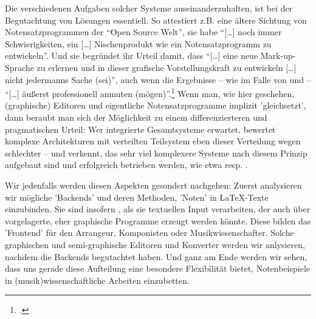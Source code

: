 Die verschiedenen Aufgaben solcher Systeme auseinanderzuhalten, ist bei der
Begutachtung von Lösungen essentiell. So attestiert z.B. eine ältere Sichtung
von Notensatzprogrammen der \enquote{Open Source Welt}, sie habe
\enquote{[\ldots] noch immer Schwierigkeiten, ein [\ldots] Nischenprodukt wie
ein Notensatzprogramm zu entwickeln}. Und sie begründet ihr Urteil damit, dass
\enquote{[\ldots] eine neue Mark-up-Sprache zu erlernen und in dieser grafische
Vorstellungskraft zu entwickeln [\ldots] nicht jedermanns Sache (sei)}, auch
wenn die Ergebnisse -- wie im Falle von  und  --
\enquote{[\ldots] äußerst professionell anmuten
(mögen)}.\footcite[vgl.][51]{Albrecht2009a} Wenn man, wie hier geschehen,
(graphische) Editoren und eigentliche Notensatzprogramme implizit 'gleichsetzt',
dann beraubt man sich der Möglichkeit zu einem differenzierteren und
pragmatischen Urteil: Wer integrierte Gesamtsysteme erwartet, bewertet komplexe
Architekturen mit verteilten Teilsystem eben dieser Verteilung wegen schlechter
-- und verkennt, das sehr viel komplexere Systeme nach diesem Prinzip aufgebaut
sind und erfolgreich betrieben werden, wie etwa  resp.
.

Wir jedenfalls werden diesen Aspekten gesondert nachgehen: Zuerst analysieren
wir mögliche 'Backends' und deren Methoden, 'Noten' in \LaTeX-Texte einzubinden.
Sie sind insofern , als sie textuellen Input verarbeiten, der auch
über vorgelagerte, eher graphische Programme erzeugt werden könnte. Diese bilden
das 'Frontend' für den Arrangeur, Komponisten oder Musikwissenschafter. Solche
graphischen und semi-graphische Editoren und Konverter werden wir anlysieren,
nachdem die Backends begutachtet haben. Und ganz am Ende werden wir sehen, dass
uns gerade diese Aufteilung eine besondere Flexibilität bietet, Notenbeispiele
in (musik)wissenschaftliche Arbeiten einzubetten.

